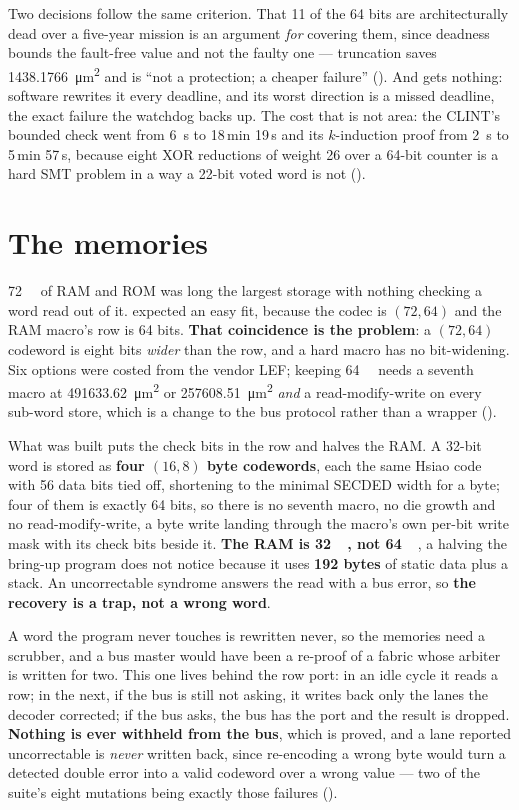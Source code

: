 Two decisions follow the same criterion. That 11 of the 64 bits are
architecturally dead over a five-year mission is an argument \emph{for}
covering them, since deadness bounds the fault-free value and not the
faulty one --- truncation saves \SI{1438.1766}{\micro\meter\squared} and
is ``not a protection; a cheaper failure''
(). And  gets nothing: software
rewrites it every deadline, and its worst direction is a missed
deadline, the exact failure the watchdog backs up. The cost that is not area: the CLINT's bounded check went from
\SI{6}{\second} to 18\,min 19\,s and its $k$-induction proof from
\SI{2}{\second} to 5\,min 57\,s, because eight XOR reductions of weight
26 over a 64-bit counter is a hard SMT problem in a way a 22-bit voted
word is not ().

\section{The memories}
\label{sec:harden-mem}

\SI{72}{\kibi\byte} of RAM and ROM was long the largest storage with
nothing checking a word read out of it.  expected an easy fit,
because the codec is $(72,64)$ and the RAM macro's row is 64 bits.
\textbf{That coincidence is the problem}: a $(72,64)$ codeword is eight
bits \emph{wider} than the row, and a hard macro has no bit-widening.
Six options were costed from the vendor LEF; keeping
\SI{64}{\kibi\byte} needs a seventh macro at
\SI{+491633.62}{\micro\meter\squared} or
\SI{+257608.51}{\micro\meter\squared} \emph{and} a read-modify-write on
every sub-word store, which is a change to the bus protocol rather than
a wrapper ().

What was built puts the check bits in the row and halves the RAM. A
32-bit word is stored as \textbf{four $(16,8)$ byte codewords}, each the
same Hsiao code with 56 data bits tied off, shortening to the minimal
SECDED width for a byte; four of them is exactly 64 bits, so there is no
seventh macro, no die growth and no read-modify-write, a byte write
landing through the macro's own per-bit write mask with its check bits
beside it. \textbf{The RAM is \SI{32}{\kibi\byte}, not
\SI{64}{\kibi\byte}}, a halving the bring-up program does not notice
because it uses \textbf{192 bytes} of static data plus a stack. An
uncorrectable syndrome answers the read with a bus error, so \textbf{the
recovery is a trap, not a wrong word}.

A word the program never touches is rewritten never, so the memories
need a scrubber, and a bus master would have been a re-proof of a fabric
whose arbiter is written for two. This one lives behind the row port: in
an idle cycle it reads a row; in the next,
if the bus is still not asking, it writes back only the lanes the
decoder corrected; if the bus asks, the bus has the port and the result
is dropped. \textbf{Nothing is ever withheld from the bus}, which is
proved, and a lane reported uncorrectable is \emph{never} written back,
since re-encoding a wrong byte would turn a detected double error into a
valid codeword over a wrong value --- two of the suite's eight mutations
being exactly those failures ().

